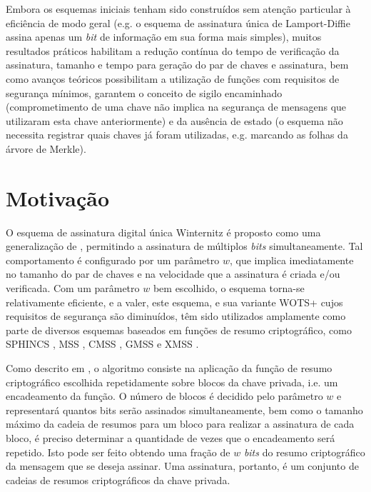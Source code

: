 \documentclass{article}
\begin{document}
Embora os esquemas iniciais tenham sido construídos sem atenção particular à
eficiência de modo geral (e.g. o esquema de assinatura única de Lamport-Diffie
\cite{Lamport1979} assina apenas um \emph{bit} de informação em sua forma mais
simples), muitos resultados práticos habilitam a redução contínua do tempo de
verificação da assinatura, tamanho e tempo para geração do par de chaves e
assinatura, bem como avanços teóricos possibilitam a utilização de funções com
requisitos de segurança mínimos, garantem o conceito de sigilo encaminhado
\cite{Buchmann:2011:XPF:2184003.2184011} (comprometimento de uma chave não
implica na segurança de mensagens que utilizaram esta chave anteriormente) e da
ausência de estado \cite{Bernstein2015} (o esquema não necessita registrar
quais chaves já foram utilizadas, e.g. marcando as folhas da árvore de Merkle).

\section{Motivação}

O esquema de assinatura digital única Winternitz é proposto como uma
generalização de \cite{Lamport1979}, permitindo a assinatura de múltiplos
\emph{bits} simultaneamente. Tal comportamento é configurado por um parâmetro
$w$, que implica imediatamente no tamanho do par de chaves e na velocidade que
a assinatura é criada e/ou verificada. Com um parâmetro $w$ bem escolhido, o
esquema torna-se relativamente eficiente, e a valer, este esquema, e sua
variante WOTS+ \cite{cryptoeprint:2017:965} cujos requisitos de segurança são
diminuídos, têm sido utilizados amplamente como parte de diversos esquemas
baseados em funções de resumo criptográfico, como SPHINCS \cite{Bernstein2015},
MSS \cite{Merkle:1989:CDS:118209.118230}, CMSS \cite{Buchmann2006}, GMSS
\cite{Buchmann2007} e XMSS \cite{Buchmann:2011:XPF:2184003.2184011}.

Como descrito em \cite{Bernstein:2008:PQC:1522375}, o algoritmo consiste na
aplicação da função de resumo criptográfico escolhida repetidamente sobre
blocos da chave privada, i.e. um encadeamento da função. O número de blocos
é decidido pelo parâmetro $w$ e representará quantos bits serão assinados
simultaneamente, bem como o tamanho máximo da cadeia de resumos para um
bloco para realizar a assinatura de cada bloco, é preciso determinar a
quantidade de vezes que o encadeamento será repetido. Isto pode ser feito
obtendo uma fração de $w$ \emph{bits} do resumo criptográfico da mensagem
que se deseja assinar. Uma assinatura, portanto, é um conjunto de cadeias
de resumos criptográficos da chave privada.
\end{document}
